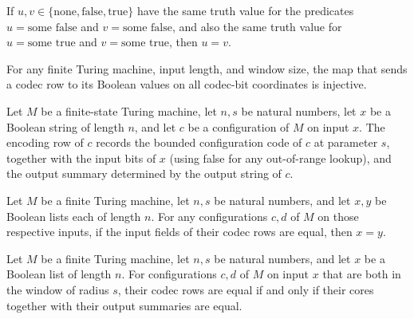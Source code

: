 \begin{theorem}
\label{Complexity.codec_symbol_ext}
\leanok
{}
If $u,v \in \{\text{none},\text{false},\text{true}\}$ have the same truth value for the
predicates $u=\text{some false}$ and $v=\text{some false}$, and also the same truth
value for $u=\text{some true}$ and $v=\text{some true}$, then $u=v$.
\end{theorem}

\begin{theorem}
\label{Complexity.codecRowBits_injective}
\leanok
{}
For any finite Turing machine, input length, and window size, the map that sends a codec
row to its Boolean values on all codec-bit coordinates is injective.
\end{theorem}

\begin{definition}
\label{Complexity.codecRowOf}
\leanok
{}
Let $M$ be a finite-state Turing machine, let $n,s$ be natural numbers, let $x$ be a
Boolean string of length $n$, and let $c$ be a configuration of $M$ on input $x$. The
encoding row of $c$ records the bounded configuration code of $c$ at parameter $s$,
together with the input bits of $x$ (using false for any out-of-range lookup), and the
output summary determined by the output string of $c$.
\end{definition}

\begin{theorem}
\label{Complexity.codecRowOf_input_eq}
\leanok
{}
Let $M$ be a finite Turing machine, let $n,s$ be natural numbers, and let $x,y$ be
Boolean lists each of length $n$. For any configurations $c,d$ of $M$ on those
respective inputs, if the input fields of their codec rows are equal, then $x=y$.
\end{theorem}

\begin{theorem}
\label{Complexity.codecRowOf_eq_iff}
\leanok
{}
Let $M$ be a finite Turing machine, let $n,s$ be natural numbers, and let $x$ be a
Boolean list of length $n$. For configurations $c,d$ of $M$ on input $x$ that are both
in the window of radius $s$, their codec rows are equal if and only if their cores
together with their output summaries are equal.
\end{theorem}

